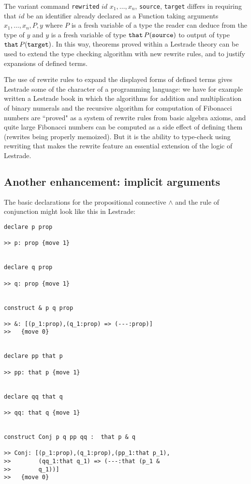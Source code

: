 \documentclass{article}
\begin{document}
The variant command  {\tt rewrited} $id$ $x_1, \ldots, x_n$, {\tt source}, {\tt target} differs in requiring that $id$ be an identifier already declared as a Function taking arguments $x_1,\ldots,x_n,P,y$ where $P$ is a fresh variable of a type the reader can deduce from the type of $y$ and $y$ is a fresh variable of type
${\tt that} \,P({\tt source})$ to output of type ${\tt that}\, P({\tt target})$.  In this way, theorems proved within a Lestrade theory can be used to extend the type checking algorithm with new rewrite rules, and to justify expansions of defined terms.

The use of rewrite rules to expand the displayed forms of defined terms gives Lestrade some of the character of a programming language:  we have for example written a Lestrade book in which the algorithms for addition and multiplication of binary numerals and the recursive algorithm for computation of Fibonacci numbers are ``proved" as a system of rewrite rules from basic algebra axioms, and quite large Fibonacci numbers can be computed as a side effect of defining them (rewrites being properly memoized).  But it is the ability to type-check using rewriting that makes the rewrite feature an essential extension of the logic of Lestrade.

\subsection{Another enhancement:  implicit arguments}

The basic declarations for the propositional connective $\wedge$ and the rule of conjunction might look like this in Lestrade:

\begin{verbatim}
declare p prop

>> p: prop {move 1}


declare q prop

>> q: prop {move 1}


construct & p q prop

>> &: [(p_1:prop),(q_1:prop) => (---:prop)]
>>   {move 0}


declare pp that p

>> pp: that p {move 1}


declare qq that q

>> qq: that q {move 1}


construct Conj p q pp qq :  that p & q

>> Conj: [(p_1:prop),(q_1:prop),(pp_1:that p_1),
>>        (qq_1:that q_1) => (---:that (p_1 & 
>>        q_1))]
>>   {move 0}


\end{verbatim}
\end{document}
